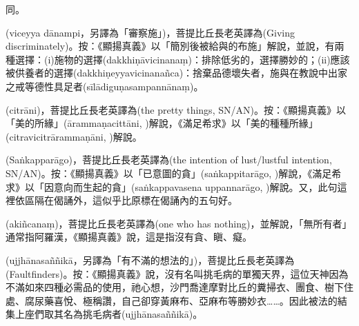 \startitemgroup[noteitems]
\item{}同。
\stopitemgroup

\startitemgroup[noteitems]
\item{}(viceyya dānampi，另譯為「審察施」)，菩提比丘長老英譯為(Giving discriminately)。按：《顯揚真義》以「簡別後被給與的布施」解說，並說，有兩種選擇：(i)施物的選擇(dakkhiṇāvicinanaṃ)：排除低劣的，選擇勝妙的；(ii)應該被供養者的選擇(dakkhiṇeyyavicinanañca)：捨棄品德壞失者，施與在教說中出家之戒等德性具足者(sīlādiguṇasampannānaṃ)。
\stopitemgroup

\startitemgroup[noteitems]
\item{}(citrāni)，菩提比丘長老英譯為(the pretty things, SN/AN)。按：《顯揚真義》以「美的所緣」(ārammaṇacittāni, )解說，《滿足希求》以「美的種種所緣」(citravicitrārammaṇāni, )解說。
\stopitemgroup

\startitemgroup[noteitems]
\item{}(Saṅkapparāgo)，菩提比丘長老英譯為(the intention of lust/lustful intention, SN/AN)。按：《顯揚真義》以「已意圖的貪」(saṅkappitarāgo, )解說，《滿足希求》以「因意向而生起的貪」(saṅkappavasena uppannarāgo, )解說。又，此句這裡依區隔在偈誦外，這似乎比原標在偈誦內的五句好。
\stopitemgroup

\startitemgroup[noteitems]
\item{}(akiñcanaṃ)，菩提比丘長老英譯為(one who has nothing)，並解說，「無所有者」通常指阿羅漢，《顯揚真義》說，這是指沒有貪、瞋、癡。
\stopitemgroup

\startitemgroup[noteitems]
\item{}(ujjhānasaññikā，另譯為「有不滿的想法的」)，菩提比丘長老英譯為(Faultfinders)。按：《顯揚真義》說，沒有名叫挑毛病的單獨天界，這位天神因為不滿如來四種必需品的使用，祂心想，沙門喬達摩對比丘的糞掃衣、團食、樹下住處、腐尿藥喜悅、極稱讚，自己卻穿黃麻布、亞麻布等勝妙衣……。因此被法的結集上座們取其名為挑毛病者(ujjhānasaññikā)。
\stopitemgroup

